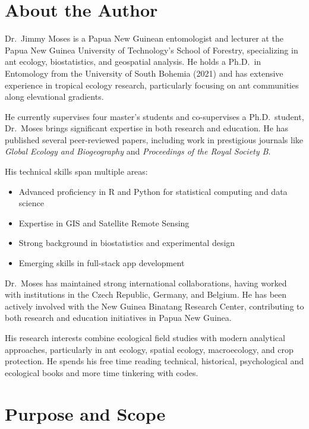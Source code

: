 \documentclass[
  letterpaper,
]{book}
\providecommand{\tightlist}{%
  \setlength{\itemsep}{0pt}\setlength{\parskip}{0pt}}
\begin{document}
\section*{About the Author}\label{about-the-author-1}


Dr.~Jimmy Moses is a Papua New Guinean entomologist and lecturer at the
Papua New Guinea University of Technology's School of Forestry,
specializing in ant ecology, biostatistics, and geospatial analysis. He
holds a Ph.D.~in Entomology from the University of South Bohemia (2021)
and has extensive experience in tropical ecology research, particularly
focusing on ant communities along elevational gradients.

He currently supervises four master's students and co-supervises a
Ph.D.~student, Dr.~Moses brings significant expertise in both research
and education. He has published several peer-reviewed papers, including
work in prestigious journals like \emph{Global Ecology and Biogeography}
and \emph{Proceedings of the Royal Society B}.

His technical skills span multiple areas:

\begin{itemize}
\tightlist
\item
  Advanced proficiency in R and Python for statistical computing and
  data science
\item
  Expertise in GIS and Satellite Remote Sensing
\item
  Strong background in biostatistics and experimental design
\item
  Emerging skills in full-stack app development
\end{itemize}

Dr.~Moses has maintained strong international collaborations, having
worked with institutions in the Czech Republic, Germany, and Belgium. He
has been actively involved with the New Guinea Binatang Research Center,
contributing to both research and education initiatives in Papua New
Guinea.

His research interests combine ecological field studies with modern
analytical approaches, particularly in ant ecology, spatial ecology,
macroecology, and crop protection. He spends his free time reading
technical, historical, psychological and ecological books and more time
tinkering with codes.

\section*{Purpose and Scope}\label{purpose-and-scope}
\end{document}
